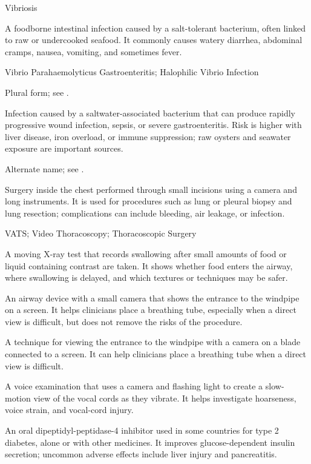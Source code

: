 \synonyms
Vibriosis

 A foodborne intestinal infection caused by a salt-tolerant bacterium, often linked to raw or undercooked seafood. It commonly causes watery diarrhea, abdominal cramps, nausea, vomiting, and sometimes fever.

\synonyms
Vibrio Parahaemolyticus Gastroenteritis; Halophilic Vibrio Infection

 Plural form; see .

 Infection caused by a saltwater-associated bacterium that can produce rapidly progressive wound infection, sepsis, or severe gastroenteritis. Risk is higher with liver disease, iron overload, or immune suppression; raw oysters and seawater exposure are important sources.

 Alternate name; see .

 Surgery inside the chest performed through small incisions using a camera and long instruments. It is used for procedures such as lung or pleural biopsy and lung resection; complications can include bleeding, air leakage, or infection.

\synonyms
VATS; Video Thoracoscopy; Thoracoscopic Surgery

 A moving X-ray test that records swallowing after small amounts of food or liquid containing contrast are taken. It shows whether food enters the airway, where swallowing is delayed, and which textures or techniques may be safer.

 An airway device with a small camera that shows the entrance to the windpipe on a screen. It helps clinicians place a breathing tube, especially when a direct view is difficult, but does not remove the risks of the procedure.

 A technique for viewing the entrance to the windpipe with a camera on a blade connected to a screen. It can help clinicians place a breathing tube when a direct view is difficult.

 A voice examination that uses a camera and flashing light to create a slow-motion view of the vocal cords as they vibrate. It helps investigate hoarseness, voice strain, and vocal-cord injury.

 An oral dipeptidyl-peptidase-4 inhibitor used in some countries for type 2 diabetes, alone or with other medicines. It improves glucose-dependent insulin secretion; uncommon adverse effects include liver injury and pancreatitis.

